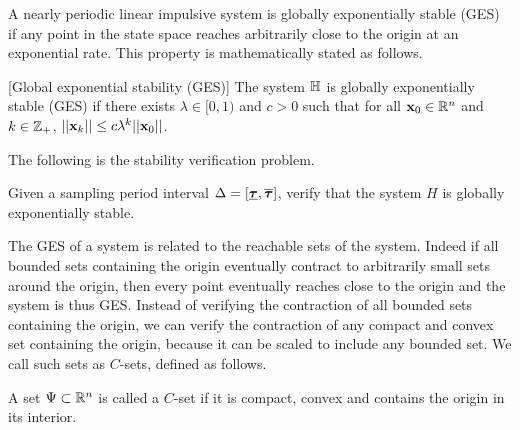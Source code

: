 A nearly periodic linear impulsive system is globally exponentially
stable (GES) if any point in the state space reaches arbitrarily close
to the origin at an exponential rate.  This property is mathematically
stated as follows.
%
\begin{defn}\label{defn:exp-stable}[Global exponential stability (GES)] The
system $\mathbb{H}$ is globally exponentially stable
(GES) if there exists $\lambda\in[0,1)$ and $c>0$ such that for all $\textbf{x}_0
\in\mathbb{R}^n$ and $k\in\mathbb{Z}_+$,
$||\textbf{x}_k||\leq c\lambda^k||\textbf{x}_0||$.
\end{defn}
%
The following is the stability verification problem.
%
\begin{problem}
Given a sampling period interval $\Delta=[\bm{\underline{\tau}},\bm{\overline{\tau}}]$, verify
that the system $H$ is globally exponentially stable.
\end{problem}
%
The GES of a system is related to the reachable sets of the
system. Indeed if all bounded sets containing the origin eventually
contract to arbitrarily small sets around the origin, then every point
eventually reaches close to the origin and the system is thus GES.
Instead of verifying the contraction of all bounded sets containing
the origin, we can verify the contraction of any compact and convex
set containing the origin, because it can be scaled to include any
bounded set. We call such sets as $C$-sets, defined as follows.
%
\begin{definition}
A set $\Psi\subset\mathbb{R}^n$ is called a $C$-set if it is compact,
convex and contains the origin in its interior.
\end{definition}
%


